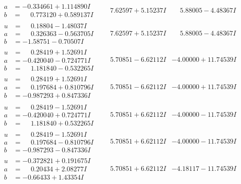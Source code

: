 \documentclass[1p]{elsarticle_modified}
\theoremstyle{definition}
\begin{document}
$$\begin{array}{c|c|c}
\begin{aligned}
a &= -0.334661 + 1.114890 I \\
b &= \phantom{-}0.773120 + 0.589137 I\end{aligned}
 & \phantom{-}7.62597 + 5.15237 I & \phantom{-}5.88005 - 4.48367 I \\ \hline\begin{aligned}
u &= \phantom{-}0.18804 - 1.48037 I \\
a &= \phantom{-}0.326363 - 0.563705 I \\
b &= -1.58751 - 0.70507 I\end{aligned}
 & \phantom{-}7.62597 + 5.15237 I & \phantom{-}5.88005 - 4.48367 I \\ \hline\begin{aligned}
u &= \phantom{-}0.28419 + 1.52691 I \\
a &= -0.420040 - 0.724771 I \\
b &= \phantom{-}1.181840 - 0.532265 I\end{aligned}
 & \phantom{-}5.70851 - 6.62112 I & -4.00000 + 11.74539 I \\ \hline\begin{aligned}
u &= \phantom{-}0.28419 + 1.52691 I \\
a &= \phantom{-}0.197684 + 0.810796 I \\
b &= -0.987293 + 0.847336 I\end{aligned}
 & \phantom{-}5.70851 - 6.62112 I & -4.00000 + 11.74539 I \\ \hline\begin{aligned}
u &= \phantom{-}0.28419 - 1.52691 I \\
a &= -0.420040 + 0.724771 I \\
b &= \phantom{-}1.181840 + 0.532265 I\end{aligned}
 & \phantom{-}5.70851 + 6.62112 I & -4.00000 - 11.74539 I \\ \hline\begin{aligned}
u &= \phantom{-}0.28419 - 1.52691 I \\
a &= \phantom{-}0.197684 - 0.810796 I \\
b &= -0.987293 - 0.847336 I\end{aligned}
 & \phantom{-}5.70851 + 6.62112 I & -4.00000 - 11.74539 I \\ \hline\begin{aligned}
u &= -0.372821 + 0.191675 I \\
a &= \phantom{-}0.20434 + 2.08277 I \\
b &= -0.66433 + 1.43354 I\end{aligned}
 & \phantom{-}5.70851 + 6.62112 I & -4.18117 - 11.74539 I \\ \hline\begin{aligned}

\end{aligned}
\end{array}$$
\end{document}
